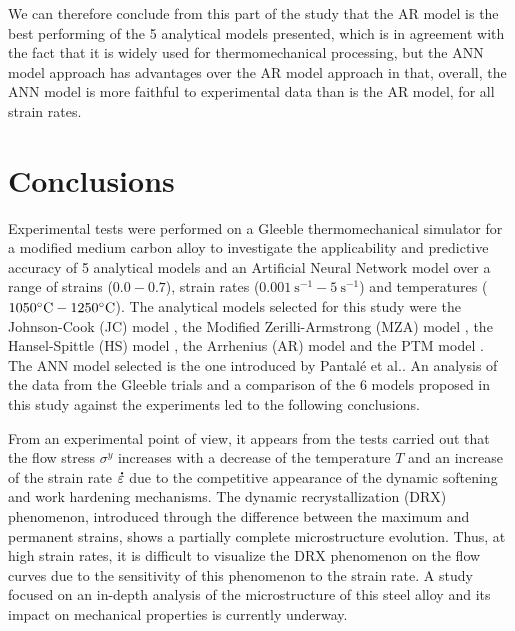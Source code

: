 \documentclass[metals,article,submit,pdftex,moreauthors]{Definitions/mdpi}
\makeatletter
\DeclareRobustCommand{\mdot}[1]{\accentset{\mbox{\bfseries .}}{#1}}
\DeclareRobustCommand{\eal}{et al.\@\xspace}
\DeclareRobustCommand{\ps}{\text{s}^{-1}}
\makeatother
\begin{document}
We can therefore conclude from this part of the study that the AR model is the best performing of the 5 analytical models presented, which is in agreement with the fact that it is widely used for thermomechanical processing, but the ANN model approach has advantages over the AR model approach in that, overall, the ANN model is more faithful to experimental data than is the AR model, for all strain rates.

\section{Conclusions\label{sec:Conclusion}}

Experimental tests were performed on a Gleeble thermomechanical simulator for a modified medium carbon alloy to investigate the applicability and predictive accuracy of 5 analytical models and an Artificial Neural Network model over a range of strains ($0.0-0.7$), strain rates ($0.001~\ps-5~\ps$) and temperatures ($1050\celsius-1250\celsius$).
The analytical models selected for this study were the Johnson-Cook (JC) model \cite{Johnson-1983}, the Modified Zerilli-Armstrong (MZA) model \cite{Samantaray-2009}, the Hansel-Spittle (HS) model \cite{Hensel-1978}, the Arrhenius (AR) model \cite{Sellars-1966} and the PTM model \cite{TizeMha-2022}.
The ANN model selected is the one introduced by Pantalé \eal \cite{Pantale-2021}.
An analysis of the data from the Gleeble trials and a comparison of the 6 models proposed in this study against the experiments led to the following conclusions.

From an experimental point of view, it appears from the tests carried out that the flow stress $\sigma^y$ increases with a decrease of the temperature $T$ and an increase of the strain rate $\mdot\varepsilon$ due to the competitive appearance of the dynamic softening and work hardening mechanisms.
The dynamic recrystallization (DRX) phenomenon, introduced through the difference between the maximum and permanent strains, shows a partially complete microstructure evolution.
Thus, at high strain rates, it is difficult to visualize the DRX phenomenon on the flow curves due to the sensitivity of this phenomenon to the strain rate.
A study focused on an in-depth analysis of the microstructure of this steel alloy and its impact on mechanical properties is currently underway.
\end{document}
